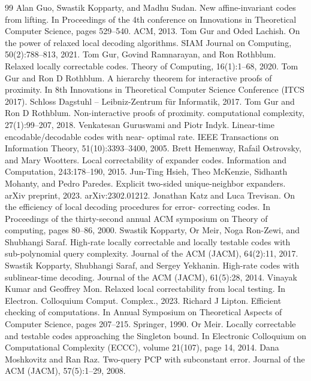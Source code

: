 \documentclass[10pt,a4paper]{article}
\begin{document}
\begin{thebibliography}{99}
 Alan Guo, Swastik Kopparty, and Madhu Sudan. New affine-invariant codes from lifting. In Proceedings of the 4th conference on Innovations in Theoretical Computer Science, pages 529–540. ACM, 2013.
 Tom Gur and Oded Lachish. On the power of relaxed local decoding algorithms. SIAM Journal on Computing, 50(2):788–813, 2021.
 Tom Gur, Govind Ramnarayan, and Ron Rothblum. Relaxed locally correctable codes. Theory of Computing, 16(1):1–68, 2020.
 Tom Gur and Ron D Rothblum. A hierarchy theorem for interactive proofs of proximity. In 8th Innovations in Theoretical Computer Science Conference (ITCS 2017). Schloss Dagstuhl – Leibniz-Zentrum für Informatik, 2017.
 Tom Gur and Ron D Rothblum. Non-interactive proofs of proximity. computational complexity, 27(1):99–207, 2018.
 Venkatesan Guruswami and Piotr Indyk. Linear-time encodable/decodable codes with near- optimal rate. IEEE Transactions on Information Theory, 51(10):3393–3400, 2005.
 Brett Hemenway, Rafail Ostrovsky, and Mary Wootters. Local correctability of expander codes. Information and Computation, 243:178–190, 2015.
 Jun-Ting Hsieh, Theo McKenzie, Sidhanth Mohanty, and Pedro Paredes. Explicit two-sided unique-neighbor expanders. arXiv preprint, 2023. arXiv:2302.01212.
 Jonathan Katz and Luca Trevisan. On the efficiency of local decoding procedures for error- correcting codes. In Proceedings of the thirty-second annual ACM symposium on Theory of computing, pages 80–86, 2000.
 Swastik Kopparty, Or Meir, Noga Ron-Zewi, and Shubhangi Saraf. High-rate locally correctable and locally testable codes with sub-polynomial query complexity. Journal of the ACM (JACM), 64(2):11, 2017.
 Swastik Kopparty, Shubhangi Saraf, and Sergey Yekhanin. High-rate codes with sublinear-time decoding. Journal of the ACM (JACM), 61(5):28, 2014.
 Vinayak Kumar and Geoffrey Mon. Relaxed local correctability from local testing. In Electron. Colloquium Comput. Complex., 2023.
 Richard J Lipton. Efficient checking of computations. In Annual Symposium on Theoretical Aspects of Computer Science, pages 207–215. Springer, 1990.
 Or Meir. Locally correctable and testable codes approaching the Singleton bound. In Electronic Colloquium on Computational Complexity (ECCC), volume 21(107), page 14, 2014.
 Dana Moshkovitz and Ran Raz. Two-query PCP with subconstant error. Journal of the ACM (JACM), 57(5):1–29, 2008.

\end{thebibliography}
\end{document}

